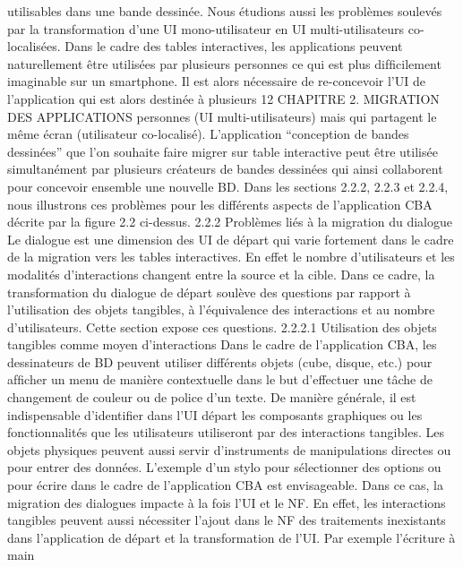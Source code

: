 \documentclass{article}
\begin{document}
utilisables dans une bande dessin\'{e}e.
Nous \'{e}tudions aussi les probl\`{e}mes soulev\'{e}s par la transformation d’une UI mono-utilisateur en UI
multi-utilisateurs co-localis\'{e}es. Dans le cadre des tables interactives, les applications peuvent naturellement \^{e}tre utilis\'{e}es par plusieurs personnes ce qui est plus difﬁcilement imaginable sur un smartphone. Il est alors n\'{e}cessaire de re-concevoir l’UI de l’application qui est alors destin\'{e}e \`{a} plusieurs
12
CHAPITRE 2. MIGRATION DES APPLICATIONS
personnes (UI multi-utilisateurs) mais qui partagent le m\^{e}me \'{e}cran (utilisateur co-localis\'{e}). L’application “conception de bandes dessin\'{e}es” que l’on souhaite faire migrer sur table interactive peut \^{e}tre
utilis\'{e}e simultan\'{e}ment par plusieurs cr\'{e}ateurs de bandes dessin\'{e}es qui ainsi collaborent pour concevoir ensemble une nouvelle BD.
Dans les sections 2.2.2, 2.2.3 et 2.2.4, nous illustrons ces probl\`{e}mes pour les diff\'{e}rents aspects de
l’application CBA d\'{e}crite par la ﬁgure 2.2 ci-dessus.
2.2.2
Probl\`{e}mes li\'{e}s \`{a} la migration du dialogue
Le dialogue est une dimension des UI de d\'{e}part qui varie fortement dans le cadre de la migration
vers les tables interactives. En effet le nombre d’utilisateurs et les modalit\'{e}s d’interactions changent
entre la source et la cible. Dans ce cadre, la transformation du dialogue de d\'{e}part soul\`{e}ve des questions par rapport \`{a} l’utilisation des objets tangibles, \`{a} l’\'{e}quivalence des interactions et au nombre
d’utilisateurs. Cette section expose ces questions.
2.2.2.1
Utilisation des objets tangibles comme moyen d’interactions
Dans le cadre de l’application CBA, les dessinateurs de BD peuvent utiliser diff\'{e}rents objets
(cube, disque, etc.) pour afﬁcher un menu de mani\`{e}re contextuelle dans le but d’effectuer une t\^{a}che de
changement de couleur ou de police d’un texte. De mani\`{e}re g\'{e}n\'{e}rale, il est indispensable d’identiﬁer
dans l’UI d\'{e}part les composants graphiques ou les fonctionnalit\'{e}s que les utilisateurs utiliseront par
des interactions tangibles.
Les objets physiques peuvent aussi servir d’instruments de manipulations directes ou pour entrer
des donn\'{e}es. L’exemple d’un stylo pour s\'{e}lectionner des options ou pour \'{e}crire dans le cadre de
l’application CBA est envisageable. Dans ce cas, la migration des dialogues impacte \`{a} la fois l’UI et
le NF. En effet, les interactions tangibles peuvent aussi n\'{e}cessiter l’ajout dans le NF des traitements
inexistants dans l’application de d\'{e}part et la transformation de l’UI. Par exemple l’\'{e}criture \`{a} main
\end{document}
